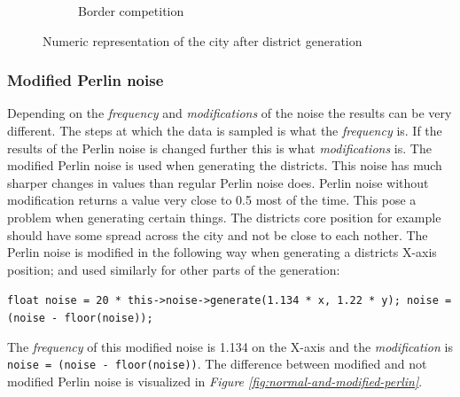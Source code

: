 \begin{figure}[h]
\begin{subfigure}{0.5\textwidth}
				\caption{Border competition}
				\label{fig:map-borders}
			\end{subfigure}
			\caption{Numeric representation of the city after district generation}
			\label{fig:map-districts-and-borders}
		\end{figure}
		
		\subsubsection{Modified Perlin noise}
		Depending on the \textit{frequency} and \textit{modifications} of the noise the results can be very different. The steps at which the data is sampled is what the \textit{frequency} is. If the results of the Perlin noise is changed further this is what \textit{modifications} is.
		The modified Perlin noise is used when generating the districts. This noise has much sharper changes in values than regular Perlin noise does. Perlin noise without modification returns a value very close to 0.5 most of the time. This pose a problem when generating certain things. The districts core position for example should have some spread across the city and not be close to each nother. The Perlin noise is modified in the following way when generating a districts X-axis position; and used similarly for other parts of the generation:
		
		\texttt{float noise = 20 * this->noise->generate(1.134 * x, 1.22 * y);
			noise = (noise - floor(noise));}
		
		The \textit{frequency} of this modified noise is 1.134 on the X-axis and the \textit{modification} is \texttt{noise = (noise - floor(noise))}.
		The difference between modified and not modified Perlin noise is visualized in \textit{Figure \ref{fig:normal-and-modified-perlin}}.
		
